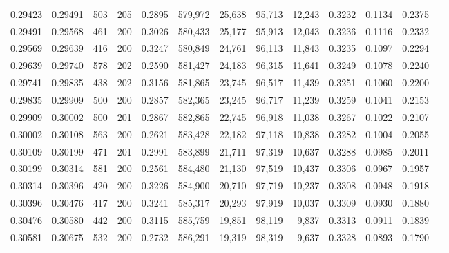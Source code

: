 \begin{tabular}{rrrrrrrrrrrrr}
0.29423 & 0.29491 &   503 & 205 &                                     0.2895 & 579,972 &  25,638 &  95,713 &  12,243 & 0.3232 & 0.1134 & 0.2375 \\
0.29491 & 0.29568 &   461 & 200 &                                     0.3026 & 580,433 &  25,177 &  95,913 &  12,043 & 0.3236 & 0.1116 & 0.2332 \\
0.29569 & 0.29639 &   416 & 200 &                                     0.3247 & 580,849 &  24,761 &  96,113 &  11,843 & 0.3235 & 0.1097 & 0.2294 \\
0.29639 & 0.29740 &   578 & 202 &                                     0.2590 & 581,427 &  24,183 &  96,315 &  11,641 & 0.3249 & 0.1078 & 0.2240 \\
0.29741 & 0.29835 &   438 & 202 &                                     0.3156 & 581,865 &  23,745 &  96,517 &  11,439 & 0.3251 & 0.1060 & 0.2200 \\
0.29835 & 0.29909 &   500 & 200 &                                     0.2857 & 582,365 &  23,245 &  96,717 &  11,239 & 0.3259 & 0.1041 & 0.2153 \\
0.29909 & 0.30002 &   500 & 201 &                                     0.2867 & 582,865 &  22,745 &  96,918 &  11,038 & 0.3267 & 0.1022 & 0.2107 \\
0.30002 & 0.30108 &   563 & 200 &                                     0.2621 & 583,428 &  22,182 &  97,118 &  10,838 & 0.3282 & 0.1004 & 0.2055 \\
0.30109 & 0.30199 &   471 & 201 &                                     0.2991 & 583,899 &  21,711 &  97,319 &  10,637 & 0.3288 & 0.0985 & 0.2011 \\
0.30199 & 0.30314 &   581 & 200 &                                     0.2561 & 584,480 &  21,130 &  97,519 &  10,437 & 0.3306 & 0.0967 & 0.1957 \\
0.30314 & 0.30396 &   420 & 200 &                                     0.3226 & 584,900 &  20,710 &  97,719 &  10,237 & 0.3308 & 0.0948 & 0.1918 \\
0.30396 & 0.30476 &   417 & 200 &                                     0.3241 & 585,317 &  20,293 &  97,919 &  10,037 & 0.3309 & 0.0930 & 0.1880 \\
0.30476 & 0.30580 &   442 & 200 &                                     0.3115 & 585,759 &  19,851 &  98,119 &   9,837 & 0.3313 & 0.0911 & 0.1839 \\
0.30581 & 0.30675 &   532 & 200 &                                     0.2732 & 586,291 &  19,319 &  98,319 &   9,637 & 0.3328 & 0.0893 & 0.1790 \\

\end{tabular}
